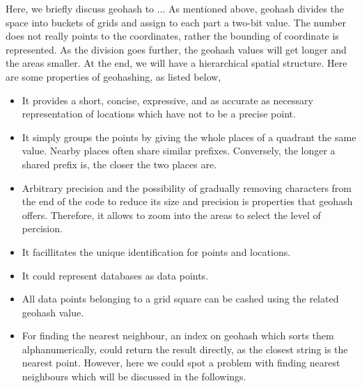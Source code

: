 \documentclass[a4paper,12pt]{article}
\begin{document}
Here, we briefly discuss geohash to ...
As mentioned above, geohash divides the space into buckets of grids and assign to each part a two-bit value. The number does not really points to the coordinates, rather the bounding of coordinate is represented. As the division goes further, the geohash values will get longer and the areas smaller. At the end, we will have a hierarchical spatial structure. Here are some properties of geohashing, as listed below,
\begin{itemize}
\item It provides a short, concise, expressive, and as accurate as necessary representation of locations which have not to be a precise point.
\item It simply groups the points by giving the whole places of a quadrant the same value. Nearby places often share similar prefixes. Conversely, the longer a shared prefix is, the closer the two places are. 
\item Arbitrary precision and the possibility of gradually removing characters from the end of the code to reduce its size and precision is properties that geohash offers. Therefore, it allows to zoom into the areas to select the level of percision.
\item It facillitates the unique identification for points and locations.
\item It could represent databases as data points.
\item All data points belonging to a grid square can be cashed using the related geohash value.
\item For finding the nearest neighbour, an index on geohash which sorts them alphanumerically, could return the result directly, as the closest string is the nearest point. However, here we could spot a problem with finding nearest neighbours which will be discussed in the followings.
\end{itemize}
\end{document}
